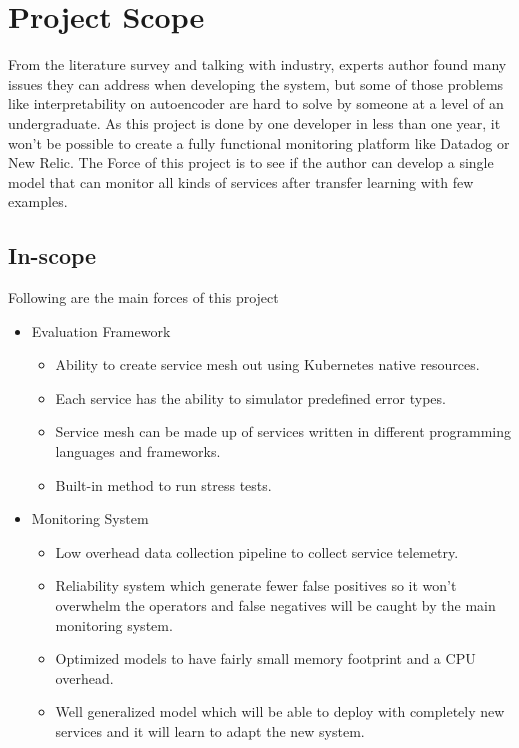 {\let\clearpage\relax\chapter{Project Scope}}

From the literature survey and talking with industry, experts author found many issues they can address when developing the system, but some of those problems like interpretability on autoencoder \citep{ribeiro2016should} are hard to solve by someone at a level of an undergraduate. As this project is done by one developer in less than one year, it won't be possible to create a fully functional monitoring platform like Datadog or New Relic. The Force of this project is to see if the author can develop a single model that can monitor all kinds of services after transfer learning with few examples. \\

\newpage

\section{In-scope} \label{sec:in-scope}
Following are the main forces of this project
\begin{itemize}[noitemsep,nolistsep] 
    \item Evaluation Framework
    \begin{itemize}[noitemsep,nolistsep] 
        \item Ability to create service mesh out using Kubernetes native resources.
        \item Each service has the ability to simulator predefined error types.
        \item Service mesh can be made up of services written in different programming languages and  frameworks.
        \item Built-in method to run stress tests.
    \end{itemize}
    \item Monitoring System
    \begin{itemize}[noitemsep,nolistsep]
        \item Low overhead data collection pipeline to collect service telemetry.
        \item Reliability system which generate fewer false positives so it won't overwhelm the operators and false negatives will be caught by the main monitoring system.
        \item Optimized models to have fairly small memory footprint and a CPU overhead.
        \item Well generalized model which will be able to deploy with completely new services and it will learn to adapt the new system.
    \end{itemize}
\end{itemize}


